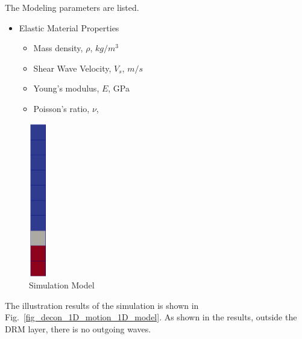 The Modeling parameters are listed.
\begin{itemize}
  \item Elastic Material Properties 
  \begin{itemize}
    \item Mass density, $\rho$, \enspace {} $kg/m^3$
    \item Shear Wave Velocity, $V_s$, \enspace {} $m/s$
    \item Young's modulus, $E$, \enspace {} GPa
    \item Poisson's ratio, $\nu$, \enspace {}
  \end{itemize}
\end{itemize}

\begin{figure}[H]
  \centering
  \includegraphics[width = 0.8cm]{./Figure-files/Day2/Deconvolution_3by1D_Motions/Free_fields_1D_model_with_DRM/overview.png}
  \caption{Simulation Model}
  \label{fig_decon_1D_motion_1D_model2}
\end{figure}

The illustration results of the simulation is shown in Fig.~\ref{fig_decon_1D_motion_1D_model}.
As shown in the results, outside the DRM layer, there is no outgoing waves. 

